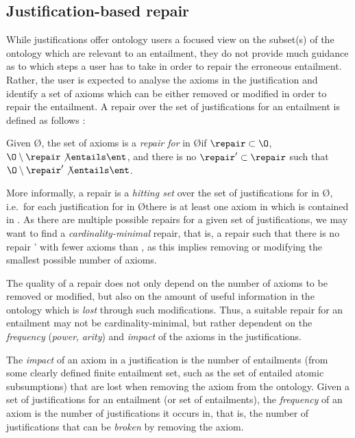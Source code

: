 \subsection{Justification-based repair}
While justifications offer ontology users a focused view on the subset(s) of the ontology which are relevant to an entailment, they do not provide much guidance as to which steps a user has to take in order to repair the erroneous entailment. Rather, the user is expected to analyse the axioms in the justification and identify a set of axioms \R which can be either removed or modified in order to repair the entailment. A repair over the set of justifications for an entailment \ent is defined as follows \cite{horridge11ab}:
\begin{defn}[Repair]
Given \O \entails \ent, the set of axioms \repair is a \emph{repair for} \ent in \O if $\repair \subset \O$, $\O \setminus \repair \not\entails \ent$, and there is no $\repair' \subset \repair$ such that $\O \setminus \repair' \not\entails \ent$.
\end{defn}

More informally, a repair is a \emph{hitting set} \repair over the set of justifications for \ent in \O, i.e.\ for each justification \J for \ent in \O there is at least one axiom in \J which is contained in \repair. As there are multiple possible repairs for a given set of justifications, we may want to find a \emph{cardinality-minimal} repair, that is, a repair \repair such that there is no repair \repair' with fewer axioms than \repair, as this implies removing or modifying the smallest possible number of axioms. 

The quality of a repair does not only depend on the number of axioms to be removed or modified, but also on the amount of  useful information in the ontology which is \emph{lost} through such modifications. Thus, a suitable repair for an entailment may not be cardinality-minimal, but rather dependent on the \emph{frequency} (\emph{power}, \emph{arity}) and \emph{impact} \cite{kalyanpur06bh} of the axioms in the justifications.

The \emph{impact} \cite{kalyanpur06bh} of an axiom in a justification is the number of entailments (from some clearly defined finite entailment set, such as the set of entailed atomic subsumptions) that are lost when removing the axiom from the ontology. Given a set of justifications for an entailment (or set of entailments), the \emph{frequency} of an axiom is the number of justifications it occurs in, that is, the number of justifications that can be \emph{broken} by removing the axiom. 

